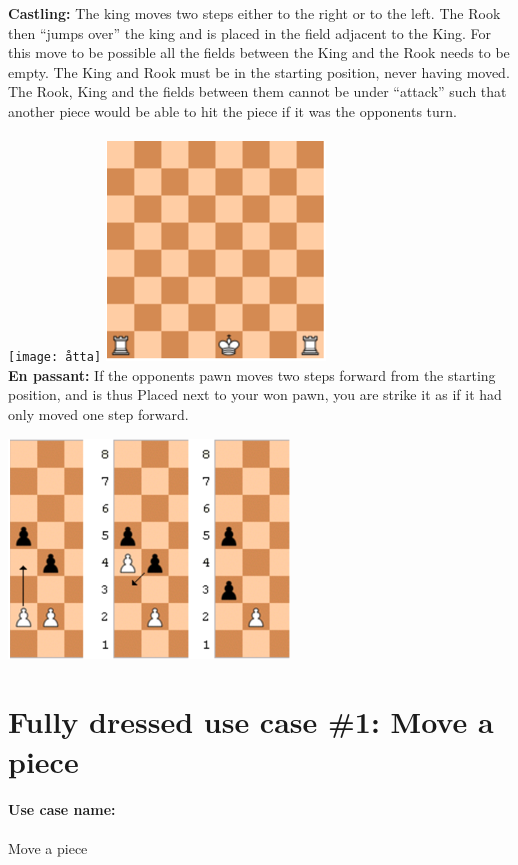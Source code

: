 \documentclass{article}
\begin{document}
\textbf{Castling:} The king moves two steps either to the right or to the left. The Rook then “jumps over” the king and is placed in the field adjacent to the King. For this move to be possible all the fields between the King and the Rook needs to be empty. The King and Rook must be in the starting position, never having moved. The Rook, King and the fields between them cannot be under “attack” such that another piece would be able to hit the piece if it was the opponents turn. 
\\\\
\hspace*{-1,8cm} 
\texttt{[image: åtta]}
\includegraphics[scale=1.02]{nio}
\\
\newpage
\noindent
\textbf{En passant:} If the opponents pawn moves two steps forward from the starting position, and is thus 
Placed next to your won pawn, you are strike it as if it had only moved one step forward.

\includegraphics[scale=0.8]{tio}
\normalsize
\newpage
\section{Fully dressed use case \#1: Move a piece}

\paragraph{Use case name:} Move a piece
\end{document}
